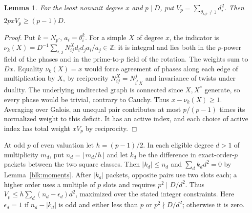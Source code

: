 \documentclass[11pt]{amsart}
\numberwithin{equation}{section}
\newtheorem{lemma}[theorem]{Lemma}
\newcommand{\ZZ}{\mathbb Z}
\begin{document}
\begin{lemma}\label{blk:activity}
For the least nonunit degree $x$ and $p\mid D$, put
$V_p=\sum_{\theta_{i,p}\ne1}d_i^2$. Then $2px V_p\ge(p-1)D$.
\end{lemma}
\begin{proof}
Put $k=N_{p'}$, $a_i=\theta_i^k$. For a simple $X$ of degree $x$, the
indicator \cite[Theorem~7.5]{NSfs} is
$\nu_k(X)=D^{-1}\sum_{i,j}N_{ij}^X d_i d_j a_i/a_j\in\ZZ$: it is
integral and lies both in the $p$-power field of the phases and in the
prime-to-$p$ field of the rotation. The weights sum to $Dx$. Equality
$\nu_k(X)=x$ would force agreement of phases along each edge of
multiplication by $X$, by reciprocity $N_{ij}^X=N_{i^*X}^{j}$ and
invariance of twists under duality. The underlying undirected graph is
connected since $X,X^*$ generate, so every phase would be trivial,
contrary to Cauchy. Thus $x-\nu_k(X)\ge1$. Averaging over Galois,
an unequal pair contributes at most $p/(p-1)$ times its normalized
weight to this deficit. It has an active index, and each choice of
active index has total weight $xV_p$ by reciprocity.
\end{proof}

At odd $p$ of even valuation let $h=(p-1)/2$. In each eligible degree
$d>1$ of multiplicity $m_d$, put $n_d=\lfloor m_d/h\rfloor$ and let $k_d$
be the difference in exact-order-$p$ packets between the two square
classes. Then $|k_d|\le n_d$ and $\sum_d k_dd^2=0$ by
Lemma~\ref{blk:moments}. After $|k_d|$ packets, opposite pairs use two
slots each; a higher order uses a multiple of $p$ slots and requires
$p^2\mid D/d^2$. Thus $V_p\le h\sum_d(n_d-\epsilon_d)d^2$, maximized
over the stated integer constraints. Here $\epsilon_d=1$ if $n_d-|k_d|$
is odd and either less than $p$ or $p^2\nmid D/d^2$; otherwise it is zero.
\end{document}
